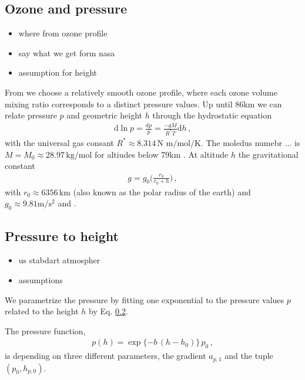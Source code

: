 \subsection{Ozone and pressure}
\begin{itemize}
	\item where from ozone profile
	\item say what we get form nasa
	\item assumption for height
\end{itemize}


From \cite{} we choose a relatively smooth ozone profile, where each ozone volume mixing ratio corresponds to a distinct pressure values.
Up until $86$km we can relate pressure $p$ and geometric height $h$ through the hydrostatic equation
\begin{align}
	\text{d} \ln p= \frac{\text{d}p}{p} = \frac{- g M}{R^* T} \text{d} h \, ,
\end{align}
with the universal gas consant $R^* \approx 8.314  \, \text{N m} / \text{mol} / \text{K}$. The moledus numebr ... is $M = M_0 \approx 28.97 \, \text{kg}/\text{mol}$ for altiudes below 79km \cite{}.
At altitude $h$ the gravitational constant
\begin{align}
	g = g_0 \Bigg( \frac{r_0}{r_0 + h} \Bigg) \, ,
\end{align}
with $r_0 \approx 6356 \, \text{km}$ (also known as the polar radius of the earth) and $g_0 \approx 9.81 \text{m}/\text{s}^2$ and \cite{}.
\subsection{Pressure to height}
\begin{itemize}
	\item us stabdart atmospher
	\item assumptions
\end{itemize}
We parametrize the pressure by fitting one exponential to the pressure values $p$ related to the height $h$ by Eq. \ref{}.

The pressure function,
\begin{align}
	p(h) =
		\exp{ \{ -b \,  (h - h_{0} ) \} } \,  p_0 \, ,
\end{align}
is depending on three different parameters, the gradient $a_{p,1}$ and the tuple $(p_0,h_{p,0})$.


